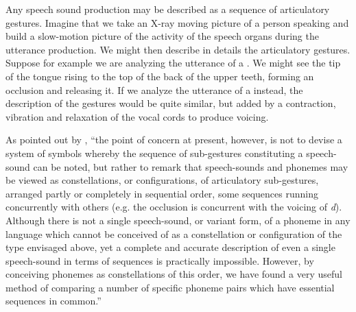 Any speech sound production may be described as a sequence of articulatory gestures. Imagine that we take an X-ray moving picture of a person speaking and build a slow-motion picture of the activity of the speech organs during the utterance production. We might then describe in details the articulatory gestures. Suppose for example we are analyzing the utterance of a \textipa{[t]}. We might see the tip of the tongue rising to the top of the back of the upper teeth, forming an occlusion and releasing it. If we analyze the utterance of a \textipa{[d]} instead, the description of the gestures would be quite similar, but added by a contraction, vibration and relaxation of the vocal cords to produce voicing.

As pointed out by \cite{zipf1949}, ``the point of concern at present, however, is not to devise a system of symbols whereby the sequence of sub-gestures constituting a speech-sound can be noted, but rather to remark that speech-sounds and phonemes may be viewed as constellations, or configurations, of articulatory sub-gestures, arranged partly or completely in sequential order, some sequences running concurrently with others (e.g. the occlusion is concurrent with the voicing of \textit{d}). Although there is not a single speech-sound, or variant form, of a phoneme in any language which cannot be conceived of as a constellation or configuration of the type envisaged above, yet a complete and accurate description of even a single speech-sound in terms of sequences is practically impossible. However, by conceiving phonemes as constellations of this order, we have found a very useful method of comparing a number of specific phoneme pairs which have essential sequences in common.''

